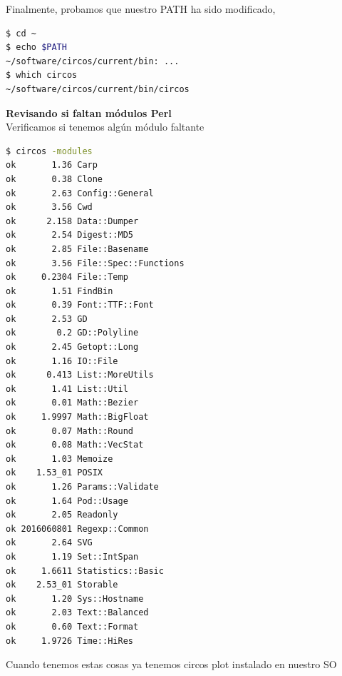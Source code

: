 \documentclass[12pt,letterpaper]{article}
\begin{document}
Finalmente, probamos que nuestro PATH ha sido modificado,\\
\begin{lstlisting}[language=bash, style=consola]
$ cd ~
$ echo $PATH
~/software/circos/current/bin: ...
$ which circos
~/software/circos/current/bin/circos
\end{lstlisting}
\textbf{Revisando si faltan módulos Perl}\\
Verificamos si tenemos algún módulo faltante\\
\begin{lstlisting}[language=bash, style=consola]
$ circos -modules
ok       1.36 Carp
ok       0.38 Clone
ok       2.63 Config::General
ok       3.56 Cwd
ok      2.158 Data::Dumper
ok       2.54 Digest::MD5
ok       2.85 File::Basename
ok       3.56 File::Spec::Functions
ok     0.2304 File::Temp
ok       1.51 FindBin
ok       0.39 Font::TTF::Font
ok       2.53 GD
ok        0.2 GD::Polyline
ok       2.45 Getopt::Long
ok       1.16 IO::File
ok      0.413 List::MoreUtils
ok       1.41 List::Util
ok       0.01 Math::Bezier
ok     1.9997 Math::BigFloat
ok       0.07 Math::Round
ok       0.08 Math::VecStat
ok       1.03 Memoize
ok    1.53_01 POSIX
ok       1.26 Params::Validate
ok       1.64 Pod::Usage
ok       2.05 Readonly
ok 2016060801 Regexp::Common
ok       2.64 SVG
ok       1.19 Set::IntSpan
ok     1.6611 Statistics::Basic
ok    2.53_01 Storable
ok       1.20 Sys::Hostname
ok       2.03 Text::Balanced
ok       0.60 Text::Format
ok     1.9726 Time::HiRes
\end{lstlisting}
Cuando tenemos estas cosas ya tenemos circos plot instalado en nuestro SO
\end{document}
